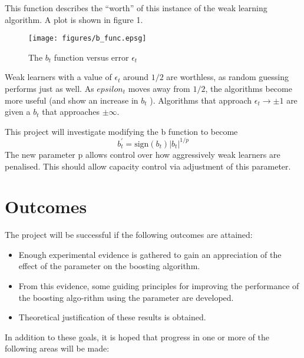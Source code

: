 	This function describes the ``worth'' of this instance of the weak
learning algorithm.  A plot is shown in figure 1.

\begin{figure}
\begin{center}
\texttt{[image: figures/b\_func.epsg]}
\end{center}
\caption{The $b_t$ function versus error $\epsilon_t$}
\end{figure}
 
Weak learners with a value of $\epsilon_t$ around $1/2$ are worthless,
as random guessing performs just as well.  As $epsilon_t$ moves away
from $1/2$, the algorithms become more useful (and show an increase in
$b_t$ ).  Algorithms that approach $\epsilon_t \rightarrow \pm 1$ are
given a $b_t$  that approaches $\pm \infty$.

This project will investigate modifying the b function to become
\begin{equation}
b^{\prime}_t = \mathrm{sign}(b_t) |b_t|^{1/p}
\end{equation}
The new parameter p allows control over how aggressively weak learners
are penalised.  This should allow capacity control via adjustment of
this parameter.

\section{Outcomes}
The project will be successful if the following outcomes are attained:

\begin{itemize}
\item	Enough experimental evidence is gathered to gain an
	appreciation of the effect of the   parameter on the boosting
	algorithm.

\item	From this evidence, some guiding principles for improving the
	performance of the boosting algo-rithm using the   parameter
	are developed.

\item	Theoretical justification of these results is obtained.
\end{itemize}

In addition to these goals, it is hoped that progress in one or more of the following areas will be made:

